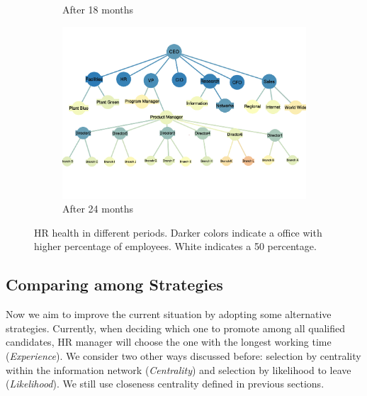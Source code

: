 \documentclass[tcn = 37075, sheet = false, abstract = false]{mcmthesis}
\begin{document}
\begin{figure}[t!]
\begin{subfigure}[h]{0.45\textwidth}
			\caption{After 18 months}
		\end{subfigure}%
		\begin{subfigure}[h]{0.45\textwidth}
			\includegraphics[width=\textwidth]{figures/24.pdf}
			\caption{After 24 months}
		\end{subfigure}
		\caption{HR health in different periods. Darker colors indicate a office with higher percentage of employees. White indicates a 50 percentage.}
		\label{fig:hr-health}
	\end{figure}
	
	
	\subsection{Comparing among Strategies}
	
	Now we aim to improve the current situation by adopting some alternative strategies. Currently, when deciding which one to promote among all qualified candidates, HR manager will choose the one with the longest working time (\textit{Experience}). We consider two other ways discussed before: selection by centrality within the information network (\textit{Centrality}) and selection by likelihood to leave (\textit{Likelihood}). We still use closeness centrality defined in previous sections. 
	
\end{document}
